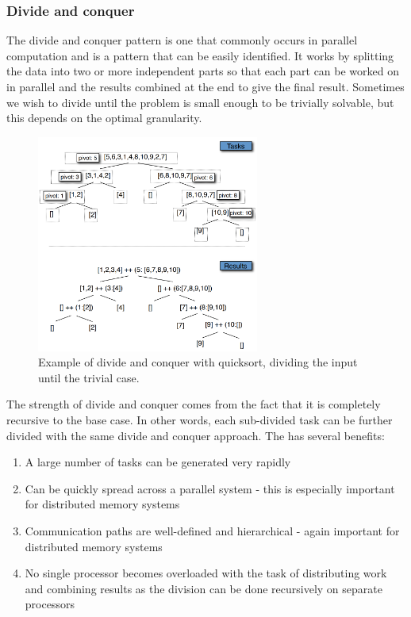 \documentclass[CS4204-Notes.tex]{subfiles}
\begin{document}
\subsubsection{Divide and conquer}
The divide and conquer pattern is one that commonly occurs in parallel computation and is a pattern that can be easily identified. It works by splitting the data into two or more independent parts so that each part can be worked on in parallel and the results combined at the end to give the final result. Sometimes we wish to divide until the problem is small enough to be trivially solvable, but this depends on the optimal granularity.
\begin{figure}[H]
  \centering
  \includegraphics[width=0.65\textwidth, keepaspectratio]{imgs/divide-and-conquer.png}
  \caption{Example of divide and conquer with quicksort, dividing the input until the trivial case.}
\end{figure}
\noindent
The strength of divide and conquer comes from the fact that it is completely recursive to the base case. In other words, each sub-divided task can be further divided with the same divide and conquer approach. The has several benefits:
\begin{enumerate}
\item A large number of tasks can be generated very rapidly
\item Can be quickly spread across a parallel system - this is especially important for distributed memory systems
\item Communication paths are well-defined and hierarchical - again important for distributed memory systems
\item No single processor becomes overloaded with the task of distributing work and combining results as the division can be done recursively on separate processors
\end{enumerate}
\end{document}
